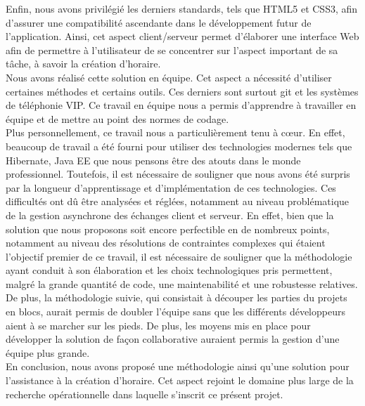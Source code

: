 \newline
\indent
Enfin, nous avons privilégié les derniers standards, tels que HTML5 et CSS3, afin d'assurer une compatibilité ascendante dans le développement futur de l'application.
Ainsi, cet aspect client/serveur permet d'élaborer une interface Web afin de permettre à l'utilisateur de se concentrer sur l'aspect important de sa tâche, à savoir la création d'horaire.\\
\newline
\indent
Nous avons réalisé cette solution en équipe. Cet aspect a nécessité d'utiliser certaines méthodes et certains outils. Ces derniers sont surtout git et les systèmes de téléphonie VIP. Ce travail en équipe nous a permis d'apprendre à travailler en équipe et de mettre au point des normes de codage.\\
\newline
\indent
Plus personnellement, ce travail nous a particulièrement tenu à cœur. En effet, beaucoup de travail a été fourni pour utiliser des technologies modernes tels que Hibernate, Java EE que nous pensons être des atouts dans le monde professionnel. Toutefois, il est nécessaire de souligner que nous avons été surpris par la longueur d'apprentissage et d'implémentation de ces technologies. Ces difficultés ont dû être analysées et réglées, notamment au niveau problématique de la gestion asynchrone des échanges client et serveur.
\newline
\indent
En effet, bien que la solution que nous proposons soit encore perfectible en de nombreux points, notamment au niveau des résolutions de contraintes complexes qui étaient l'objectif premier de ce travail, il est nécessaire de souligner que la méthodologie ayant conduit à son élaboration et les choix technologiques pris permettent, malgré la grande quantité de code, une maintenabilité et une robustesse relatives.
\newline
\indent
De plus, la méthodologie suivie, qui consistait à découper les parties du projets en blocs, aurait permis de doubler l'équipe sans que les différents développeurs aient à se marcher sur les pieds. De plus, les moyens mis en place pour développer la solution de façon collaborative auraient permis la gestion d'une équipe plus grande.\\
\newline
\indent
En conclusion, nous avons proposé une méthodologie ainsi qu'une solution pour l'assistance à la création d'horaire. Cet aspect rejoint le domaine plus large de la recherche opérationnelle dans laquelle s'inscrit ce présent projet. 




